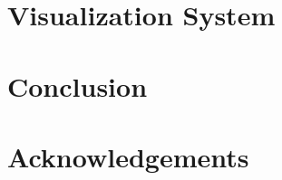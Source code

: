 \documentclass[11pt]{article}
\begin{document}
\section{Visualization System}

\section{Conclusion}

\section*{Acknowledgements}


% 
% 



\end{document}
